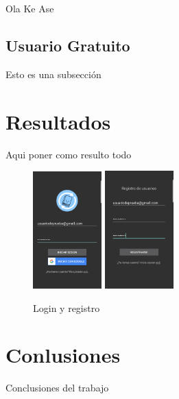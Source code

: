 \documentclass[]{IEEEtran}
\begin{document}
Ola Ke Ase 

\subsection{Usuario Gratuito}

Esto es una subsección

\section{Resultados}

Aqui poner como resulto todo

\begin{figure}
	\centering
	\captionsetup{justification=centering}
	\includegraphics[width=100px]{login.png}
	\hspace{5px}
	\includegraphics[width=100px]{registro.png}
	\caption{Login y registro}
	\label{FI12}
\end{figure}

\section{Conlusiones}

Conclusiones del trabajo

%

%




\end{document}
